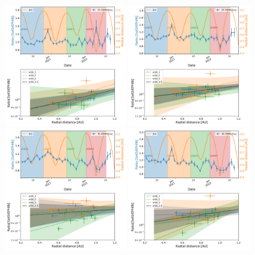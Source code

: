 \begin{figure}[!htb]
    \centering
    \includegraphics[width =0.48\textwidth, height = 0.3\textheight]{images/ACR/seperate_mask_1-3_newSOHOSEPmask/ratio_time_radialgradient_10-20MeV.png}
    \includegraphics[width =0.48\textwidth, height = 0.3\textheight]{images/ACR/seperate_mask_1-3_newSOHOSEPmask/ratio_time_radialgradient_20-30MeV.png}
    \includegraphics[width =0.48\textwidth, height = 0.3\textheight]{images/ACR/seperate_mask_1-3_newSOHOSEPmask/ratio_time_radialgradient_30-40MeV.png}
    \includegraphics[width =0.48\textwidth, height = 0.3\textheight]{images/ACR/seperate_mask_1-3_newSOHOSEPmask/ratio_time_radialgradient_40-50MeV.png}

\end{figure}
